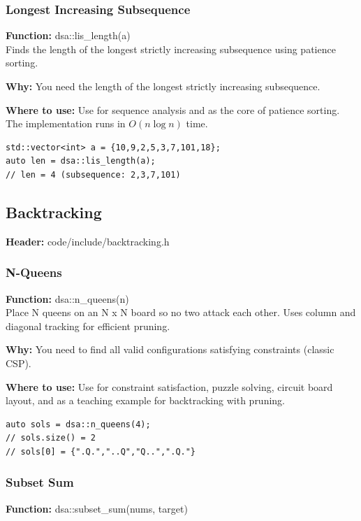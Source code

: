 \documentclass[11pt]{article}
\begin{document}
\subsubsection{Longest Increasing Subsequence}
\textbf{Function:} dsa::lis\_length(a)\\

Finds the length of the longest strictly increasing subsequence using patience sorting.

\textbf{Why:} You need the length of the longest strictly increasing subsequence. \par \textbf{Where to use:} Use for sequence analysis and as the core of patience sorting. The implementation runs in \(O(n\log n)\) time.

\begin{lstlisting}
std::vector<int> a = {10,9,2,5,3,7,101,18};
auto len = dsa::lis_length(a);
// len = 4 (subsequence: 2,3,7,101)
\end{lstlisting}

\subsection{Backtracking}
\textbf{Header:} code/include/backtracking.h

\subsubsection{N-Queens}
\textbf{Function:} dsa::n\_queens(n)\\

Place N queens on an N x N board so no two attack each other. Uses column and diagonal tracking for efficient pruning.

\textbf{Why:} You need to find all valid configurations satisfying constraints (classic CSP). \par \textbf{Where to use:} Use for constraint satisfaction, puzzle solving, circuit board layout, and as a teaching example for backtracking with pruning.

\begin{lstlisting}
auto sols = dsa::n_queens(4);
// sols.size() = 2
// sols[0] = {".Q.","..Q","Q..",".Q."}
\end{lstlisting}

\subsubsection{Subset Sum}
\textbf{Function:} dsa::subset\_sum(nums, target)\\
\end{document}
